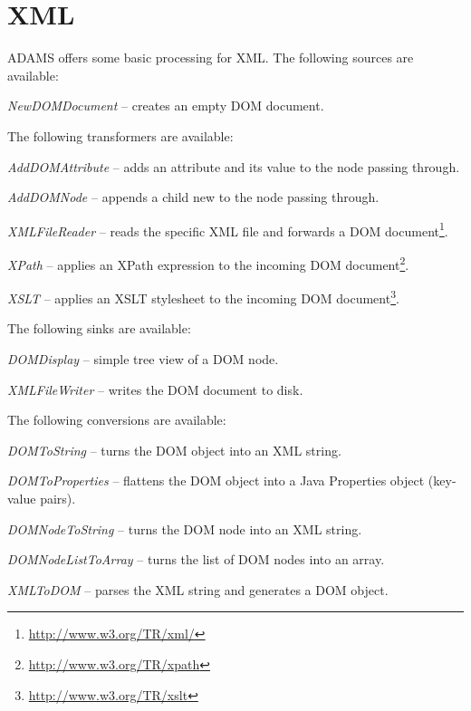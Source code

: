 \section{XML}
\label{xml}
ADAMS offers some basic processing for XML.
The following sources are available:
\begin{tight_itemize}
	\item \textit{NewDOMDocument} -- creates an empty DOM document.
\end{tight_itemize}
The following transformers are available:
\begin{tight_itemize}
	\item \textit{AddDOMAttribute} -- adds an attribute and its value to the 
	node passing through.
	\item \textit{AddDOMNode} -- appends a child new to the node passing through.
	\item \textit{XMLFileReader} -- reads the specific XML file and forwards
	a DOM document\footnote{\url{http://www.w3.org/TR/xml/}{}}.
	\item \textit{XPath} -- applies an XPath expression to the incoming DOM
	document\footnote{\url{http://www.w3.org/TR/xpath}{}}.
	\item \textit{XSLT} -- applies an XSLT stylesheet to the incoming DOM
	document\footnote{\url{http://www.w3.org/TR/xslt}{}}.
\end{tight_itemize}
The following sinks are available:
\begin{tight_itemize}
	\item \textit{DOMDisplay} -- simple tree view of a DOM node.
	\item \textit{XMLFileWriter} -- writes the DOM document to disk.
\end{tight_itemize}
The following conversions are available:
\begin{tight_itemize}
	\item \textit{DOMToString} -- turns the DOM object into an XML string.
	\item \textit{DOMToProperties} -- flattens the DOM object into a Java 
	Properties object (key-value pairs).
	\item \textit{DOMNodeToString} -- turns the DOM node into an XML string.
	\item \textit{DOMNodeListToArray} -- turns the list of DOM nodes into an array.
	\item \textit{XMLToDOM} -- parses the XML string and generates a DOM 
	object.
\end{tight_itemize}


